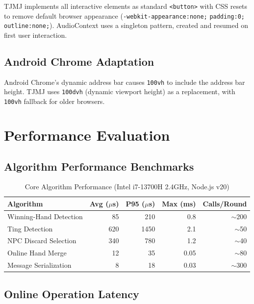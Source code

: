 \documentclass[11pt,a4paper]{article}
\begin{document}
TJMJ implements all interactive elements as standard \texttt{<button>} with CSS resets to remove default browser appearance (\texttt{-webkit-appearance:none;} \texttt{padding:0;} \texttt{outline:none;}). AudioContext uses a singleton pattern, created and resumed on first user interaction.

\subsection{Android Chrome Adaptation}

Android Chrome's dynamic address bar causes \texttt{100vh} to include the address bar height. TJMJ uses \texttt{100dvh} (dynamic viewport height) as a replacement, with \texttt{100vh} fallback for older browsers.

\newpage
\section{Performance Evaluation}

\subsection{Algorithm Performance Benchmarks}

\begin{table}[H]
\centering
\caption{Core Algorithm Performance (Intel i7-13700H 2.4GHz, Node.js v20)}
\label{tab:perf}
\small
\begin{tabular}{@{}lrrrr@{}}
\toprule
\textbf{Algorithm} & \textbf{Avg ($\mu$s)} & \textbf{P95 ($\mu$s)} & \textbf{Max (ms)} & \textbf{Calls/Round} \\
\midrule
Winning-Hand Detection & 85 & 210 & 0.8 & $\sim$200 \\
Ting Detection & 620 & 1450 & 2.1 & $\sim$50 \\
NPC Discard Selection & 340 & 780 & 1.2 & $\sim$40 \\
Online Hand Merge & 12 & 35 & 0.05 & $\sim$80 \\
Message Serialization & 8 & 18 & 0.03 & $\sim$300 \\
\bottomrule
\end{tabular}
\end{table}

\subsection{Online Operation Latency}
\end{document}
